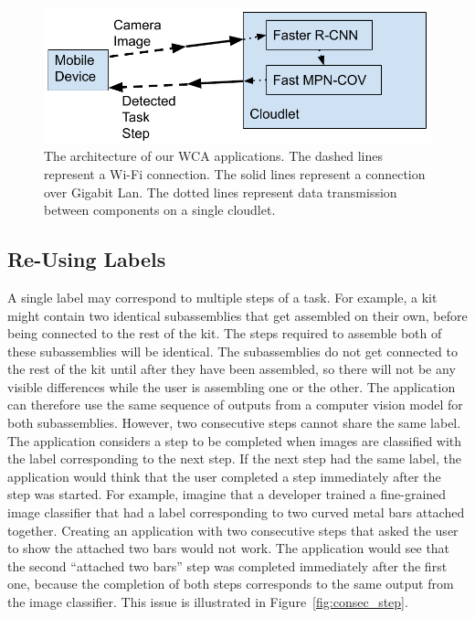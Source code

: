 \begin{figure}
  \includegraphics[width=\columnwidth]{figures/architecture.pdf}
  \caption[The architecture of our WCA applications]{
    The architecture of our WCA applications.
    The dashed lines represent a Wi-Fi connection.
    The solid lines represent a connection over Gigabit Lan.
    The dotted lines represent data transmission between components on a single
    cloudlet.
  }\label{fig:arch}
\end{figure}

\subsection{Re-Using Labels}

A single label may correspond to multiple steps of a task.
For example, a kit might contain two identical subassemblies that get assembled
on their own, before being connected to the rest of the kit.
The steps required to assemble both of these subassemblies will be identical.
The subassemblies do not get connected to the rest of the kit until after they
have been assembled, so there will not be any visible differences while the user
is assembling one or the other.
The application can therefore use the same sequence of outputs from a computer
vision model for both subassemblies.
However, two consecutive steps cannot share the same label.
The application considers a step to be completed when images are classified with
the label corresponding to the next step.
If the next step had the same label, the application would think that the user
completed a step immediately after the step was started.
For example, imagine that a developer trained a fine-grained image classifier
that had a label corresponding to two curved metal bars attached together.
Creating an application with two consecutive steps that asked the user to show
the attached two bars would not work.
The application would see that the second ``attached two bars'' step was
completed immediately after the first one, because the completion of both steps
corresponds to the same output from the image classifier.
This issue is illustrated in Figure~\ref{fig:consec_step}.

